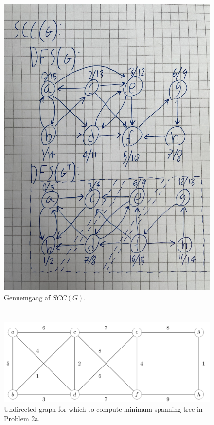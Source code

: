 \documentclass[a4paper,12pt]{article}
\begin{document}
\begin{figure}[H]
    \centering
    \includegraphics[width=1\textwidth]{SCC.jpg}
    \caption{Gennemgang af $SCC(G)$.}
\end{figure}

\subsection[]{}



\section[Question 2]{}
\begin{figure}[H]
    \centering
    \includegraphics[width=1\textwidth]{2.png}
    \caption{Undirected graph for which to compute minimum spanning tree in Problem 2a.}
\end{figure}
\end{document}
